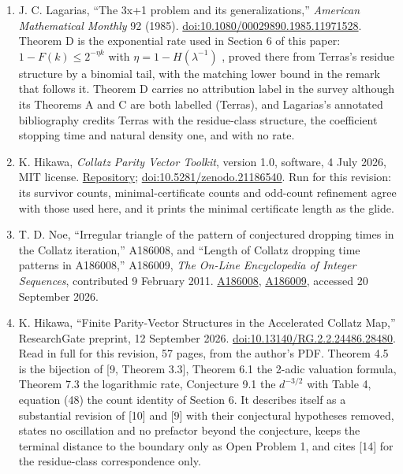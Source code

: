 \documentclass[11pt,a4paper]{article}
\begin{document}
\begin{enumerate}
  M. Winkler, ``Admissible qx + 1 Sequences, Semiconvergents, and
  Rational Catalan Numbers,'' arXiv:2609.22303, 14 September 2026. Read
  for this revision. The source of the two-sided bound on \(M_d\) used
  in the repository; Corollary 11 gives the growth constant
  \(2.8395137305\) and Corollary 12 the exact normalized oscillation, as
  an envelope between \(1\) and \(2.7095112914\) attained on the record
  minima and maxima of \(\{r\log_23\}\) .
  \href{https://arxiv.org/abs/2609.22303}{arXiv:2609.22303}.
\item
  J. C. Lagarias, ``The 3x+1 problem and its generalizations,''
  \emph{American Mathematical Monthly} 92 (1985).
  \href{https://doi.org/10.1080/00029890.1985.11971528}{doi:10.1080/00029890.1985.11971528}.
  Theorem D is the exponential rate used in Section 6 of this paper:
  \(1-F(k)\le2^{-\eta k}\) with \(\eta=1-H(\lambda^{-1})\) , proved
  there from Terras's residue structure by a binomial tail, with the
  matching lower bound in the remark that follows it. Theorem D carries
  no attribution label in the survey although its Theorems A and C are
  both labelled (Terras), and Lagarias's annotated bibliography credits
  Terras with the residue-class structure, the coefficient stopping time
  and natural density one, and with no rate.
\item
  K. Hikawa, \emph{Collatz Parity Vector Toolkit}, version 1.0,
  software, 4 July 2026, MIT license.
  \href{https://github.com/hikawa94/Collatz-Parity-Vector-Toolkit}{Repository};
  \href{https://doi.org/10.5281/zenodo.21186540}{doi:10.5281/zenodo.21186540}.
  Run for this revision: its survivor counts, minimal-certificate counts
  and odd-count refinement agree with those used here, and it prints the
  minimal certificate length as the glide.
\item
  T. D. Noe, ``Irregular triangle of the pattern of conjectured dropping
  times in the Collatz iteration,'' A186008, and ``Length of Collatz
  dropping time patterns in A186008,'' A186009, \emph{The On-Line
  Encyclopedia of Integer Sequences}, contributed 9 February 2011.
  \href{https://oeis.org/A186008}{A186008},
  \href{https://oeis.org/A186009}{A186009}, accessed 20 September 2026.
\item
  K. Hikawa, ``Finite Parity-Vector Structures in the Accelerated
  Collatz Map,'' ResearchGate preprint, 12 September 2026.
  \href{https://doi.org/10.13140/RG.2.2.24486.28480}{doi:10.13140/RG.2.2.24486.28480}.
  Read in full for this revision, 57 pages, from the author's PDF.
  Theorem 4.5 is the bijection of {[}9, Theorem 3.3{]}, Theorem 6.1 the
  2-adic valuation formula, Theorem 7.3 the logarithmic rate, Conjecture
  9.1 the \(d^{-3/2}\) with Table 4, equation (48) the count identity of
  Section 6. It describes itself as a substantial revision of {[}10{]}
  and {[}9{]} with their conjectural hypotheses removed, states no
  oscillation and no prefactor beyond the conjecture, keeps the terminal
  distance to the boundary only as Open Problem 1, and cites {[}14{]}
  for the residue-class correspondence only.
\end{enumerate}
\end{document}
